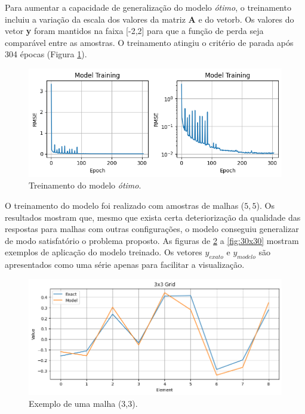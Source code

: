 \documentclass[final,5p]{elsarticle}
\numberwithin{equation}{section}
\begin{document}
    Para aumentar a capacidade de generalização do modelo \emph{ótimo}, o treinamento incluiu a variação da escala dos valores da matriz \textbf{A} e do vetor{b}. Os valores do vetor \textbf{y} foram mantidos na faixa [-2,2] para que a função de perda seja comparável entre as amostras. O treinamento atingiu o critério de parada após 304 épocas (Figura \ref{fig:loss}).

    \begin{figure}[hbt!]
        \centering
        \includegraphics[width=0.95\columnwidth]{./fig/loss.png}
        \caption{Treinamento do modelo \emph{ótimo}.}\label{fig:loss}
    \end{figure}

    O treinamento do modelo foi realizado com amostras de malhas ($5,5$). Os resultados mostram que, mesmo que exista certa deteriorização da qualidade das respostas para malhas com outras configurações, o modelo conseguiu generalizar de modo satisfatório o problema proposto. As figuras de \ref{fig:3x3} a \ref{fig:30x30} mostram exemplos de aplicação do modelo treinado. Os vetores \textbf{$y_{exato}$} e \textbf{$y_{modelo}$} são apresentados como uma série apenas para facilitar a visualização.

    \begin{figure}[hbt!]
        \centering
        \includegraphics[width=0.95\columnwidth]{./fig/3x3.png}
        \caption{Exemplo de uma malha ($3$,$3$).}\label{fig:3x3}
    \end{figure}
\end{document}

